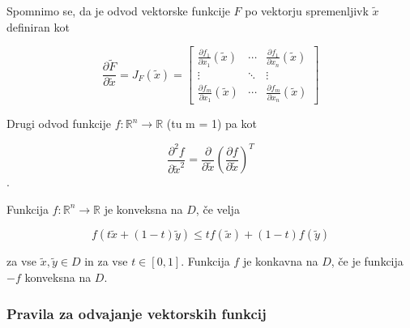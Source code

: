 \documentclass{article}
\begin{document}
\begin{multicols}{2}
	Spomnimo se, da je odvod vektorske funkcije \( F \) po vektorju spremenljivk \( \tilde{x} \) definiran kot

	\[
		\frac{\partial \tilde{F}}{\partial \tilde{x}} = J_F(\tilde{x}) =
		\begin{bmatrix}
			\frac{\partial f_1}{\partial x_1} (\tilde{x}) & \cdots & \frac{\partial f_1}{\partial x_n} (\tilde{x}) \\
			\vdots                                        & \ddots & \vdots                                        \\
			\frac{\partial f_m}{\partial x_1} (\tilde{x}) & \cdots & \frac{\partial f_m}{\partial x_n} (\tilde{x})
		\end{bmatrix}
	\]

	Drugi odvod funkcije \( f: \mathbb{R}^n \rightarrow \mathbb{R} \) (tu m = 1) pa kot

	\[
		\frac{\partial^2 f}{\partial \tilde{x}^2} = \frac{\partial}{\partial \tilde{x}} \left( \frac{\partial f}{\partial \tilde{x}} \right)^T
	\].

	Funkcija \( f: \mathbb{R}^n \rightarrow \mathbb{R} \) je konveksna na \( D \), če velja

	\[
		f(t \tilde{x} + (1-t) \tilde{y}) \leq t f(\tilde{x}) + (1-t) f(\tilde{y})
	\]

	za vse \( \tilde{x}, \tilde{y} \in D \) in za vse \( t \in [0, 1] \). Funkcija \( f \) je konkavna na \( D \), če je funkcija \( -f \) konveksna na \( D \).

	\subsubsection{Pravila za odvajanje vektorskih funkcij}


\end{multicols}
\end{document}
